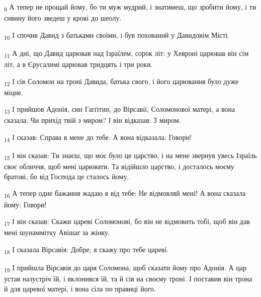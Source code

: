 \begin{tcolorbox}
\textsubscript{9} А тепер не прощай йому, бо ти муж мудрий, і знатимеш, що зробити йому, і ти сивину його зведеш у крові до шеолу.
\end{tcolorbox}
\begin{tcolorbox}
\textsubscript{10} І спочив Давид з батьками своїми, і був похований у Давидовім Місті.
\end{tcolorbox}
\begin{tcolorbox}
\textsubscript{11} А дні, що Давид царював над Ізраїлем, сорок літ: у Хевроні царював він сім літ, а в Єрусалимі царював тридцять і три роки.
\end{tcolorbox}
\begin{tcolorbox}
\textsubscript{12} І сів Соломон на троні Давида, батька свого, і його царювання було дуже міцне.
\end{tcolorbox}
\begin{tcolorbox}
\textsubscript{13} І прийшов Адонія, син Гаґґітин, до Вірсавії, Соломонової матері, а вона сказала: Чи прихід твій з миром? І він відказав: З миром.
\end{tcolorbox}
\begin{tcolorbox}
\textsubscript{14} І сказав: Справа в мене до тебе. А вона відказала: Говори!
\end{tcolorbox}
\begin{tcolorbox}
\textsubscript{15} І він сказав: Ти знаєш, що моє було це царство, і на мене звернув увесь Ізраїль своє обличчя, щоб мені царювати. Та відійшло царство, і досталось моєму братові, бо від Господа це сталось йому.
\end{tcolorbox}
\begin{tcolorbox}
\textsubscript{16} А тепер одне бажання жадаю я від тебе: Не відмовляй мені! А вона сказала йому: Говори!
\end{tcolorbox}
\begin{tcolorbox}
\textsubscript{17} І він сказав: Скажи цареві Соломонові, бо він не відмовить тобі, щоб він дав мені шунаммітку Авішаґ за жінку.
\end{tcolorbox}
\begin{tcolorbox}
\textsubscript{18} І сказала Вірсавія: Добре, я скажу про тебе цареві.
\end{tcolorbox}
\begin{tcolorbox}
\textsubscript{19} І прийшла Вірсавія до царя Соломона, щоб сказати йому про Адонія. А цар устав назустріч їй, і вклонився їй, та й сів на своєму троні. І поставив він трона й для царевої матері, і вона сіла по правиці його.
\end{tcolorbox}
